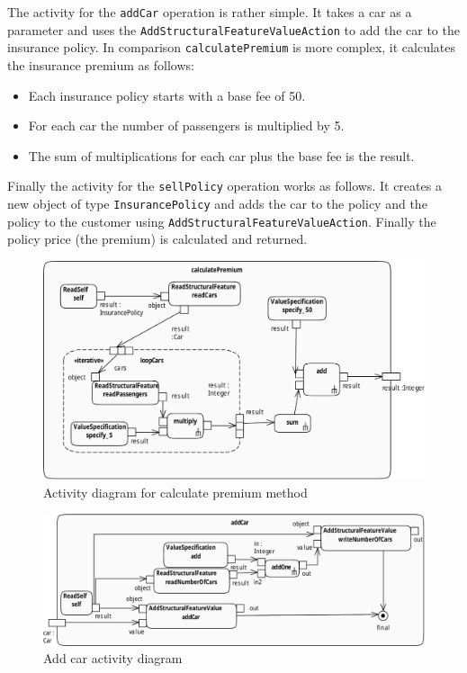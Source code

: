 \documentclass{llncs}
\begin{document}
The activity for the \lstinline|addCar| operation is rather simple. It takes a car as a parameter and uses the
\lstinline|AddStructuralFeatureValueAction| to add the car to the insurance policy. In comparison \lstinline|calculatePremium| is
more complex, it calculates the insurance premium as follows:

\begin{itemize}
 \item Each insurance policy starts with a base fee of 50.
 \item For each car the number of passengers is multiplied by 5.
 \item The sum of multiplications for each car plus the base fee is the result.
\end{itemize}

Finally the activity for the \lstinline|sellPolicy| operation works as follows. It creates a new object of type \lstinline|InsurancePolicy| and adds the car to the policy and the policy to the customer using \lstinline|AddStructuralFeatureValueAction|. Finally
the policy price (the premium) is calculated and returned.

\begin{figure}[h!t]
 \centering
 \includegraphics[scale=0.76]{images/calculatePremium.pdf}
 \caption{Activity diagram for calculate premium method}
 \label{fig:calculatePremium}
\end{figure}

\begin{figure}[ht]
 \centering
 \includegraphics[scale=0.7]{images/addCar-activity_diagram}
 \caption{Add car activity diagram}
 \label{fig:addCar}
\end{figure}
\end{document}
